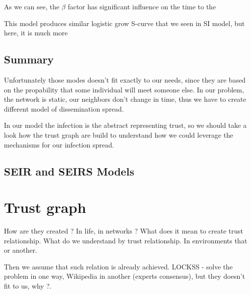\documentclass[nostrict]{szablonPG}
\begin{document}
As we can see, the $\beta$ factor has significant influence on the time to the 

This model produces similar logistic grow S-curve that we seen in SI model, but here, it is much more 
\subsection{Summary}
Unfortunately those modes doesn't fit exactly to our needs, since they are based on the propability that some individual will meet someone else. In our problem, the network is static, our neighbors don't change in time, thus we have to create different model of dissemination spread. 

In our model the infection is the abstract representing trust, so we should take a look how the trust graph are build to understand how we could leverage the mechanisms for our infection spread.

\subsection{SEIR and SEIRS Models}


\section{Trust graph}
How are they created ? In life, in networks ? What does it mean to create trust relationship. What do we understand by trust relationship. In environments that or another. 

Then we assume that such relation is already achieved. 
LOCKSS - solve the problem in one way, Wikipedia in another (experts consensus), but they doesn't fit to us, why ?. 
\end{document}
